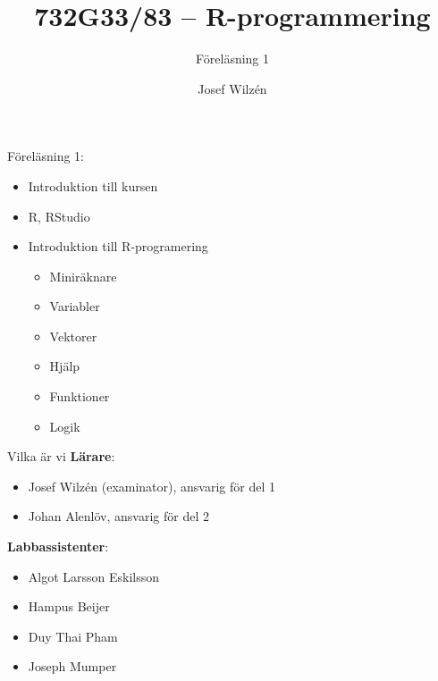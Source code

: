 \documentclass[
  10pt,
  ignorenonframetext,
]{beamer}
\title{732G33/83 -- R-programmering}
\subtitle{Föreläsning 1}
\author{Josef Wilzén}
\date{}
\institute{Linköpings Universitet}
\providecommand{\tightlist}{%
  \setlength{\itemsep}{0pt}\setlength{\parskip}{0pt}}
\begin{document}
\frame{\titlepage}

\begin{frame}{Föreläsning 1:}
\protect\hypertarget{fuxf6reluxe4sning-1}{}
\begin{itemize}
\tightlist
\item
  Introduktion till kursen 
\item
  R, RStudio
\item
  Introduktion till R-programering

  \begin{itemize}
  \tightlist
  \item
    Miniräknare
  \item
    Variabler
  \item
    Vektorer
  \item
    Hjälp
  \item
    Funktioner
  \item
    Logik
  \end{itemize}
\end{itemize}
\end{frame}

\begin{frame}{Vilka är vi}
\protect\hypertarget{vilka-uxe4r-vi}{}
\textbf{Lärare}:

\begin{itemize}
\tightlist
\item
  Josef Wilzén (examinator), ansvarig för del 1
\item 
  Johan Alenlöv, ansvarig för del 2
\end{itemize}


\textbf{Labbassistenter}:

\begin{itemize}
\tightlist
\item
  Algot Larsson Eskilsson
\item
  Hampus Beijer
\item
  Duy Thai Pham
\item
  Joseph Mumper
\end{itemize}
\end{frame}
\end{document}
